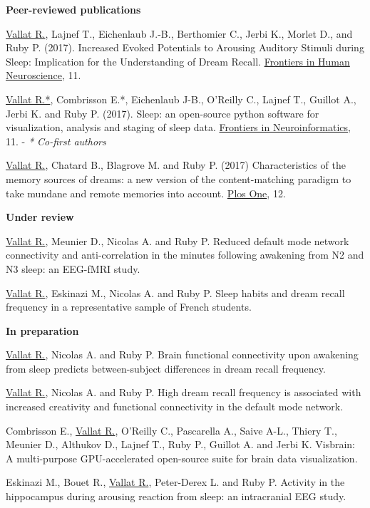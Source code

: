\label{sec:publications}
\vspace*{-10mm}

\textbf{Peer-reviewed publications}

\underline{Vallat R.}, Lajnef T., Eichenlaub J.-B., Berthomier C., Jerbi K., Morlet D., and Ruby P. (2017). Increased Evoked Potentials to Arousing Auditory Stimuli during Sleep: Implication for the Understanding of Dream Recall. \href{https://doi.org/10.3389/fnhum.2017.00132}{Frontiers in Human Neuroscience}, 11.

\underline{Vallat R.*}, Combrisson E.*, Eichenlaub J-B., O'Reilly C., Lajnef T., Guillot A., Jerbi K. and Ruby P. (2017). Sleep: an open-source python software for visualization, analysis and staging of sleep data. \href{https://doi.org/10.3389/fninf.2017.00060}{Frontiers in Neuroinformatics}, 11. - \emph{* Co-first authors}

\underline{Vallat R.}, Chatard B., Blagrove M. and Ruby P. (2017) Characteristics of the memory sources of dreams: a new version of the content-matching paradigm to take mundane and remote memories into account. \href{https://doi.org/10.1371/journal.pone.0185262}{Plos One}, 12.

\textbf{Under review}

\underline{Vallat R.}, Meunier D., Nicolas A. and Ruby P. Reduced default mode network connectivity and anti-correlation in the minutes following awakening from N2 and N3 sleep: an EEG-fMRI study.

\underline{Vallat R.}, Eskinazi M., Nicolas A. and Ruby P. Sleep habits and dream recall frequency in a representative sample of French students.

\textbf{In preparation}

\underline{Vallat R.}, Nicolas A. and Ruby P. Brain functional connectivity upon awakening from sleep predicts between-subject differences in dream recall frequency.

\underline{Vallat R.}, Nicolas A. and Ruby P. High dream recall frequency is associated with increased creativity and functional connectivity in the default mode network.

Combrisson E., \underline{Vallat R.}, O'Reilly C., Pascarella A., Saive A-L., Thiery T., Meunier D., Althukov D., Lajnef T., Ruby P., Guillot A. and Jerbi K. Visbrain: A multi-purpose GPU-accelerated open-source suite for brain data visualization.

Eskinazi M., Bouet R., \underline{Vallat R.}, Peter-Derex L. and Ruby P. Activity in the hippocampus during arousing reaction from sleep: an intracranial EEG study.

